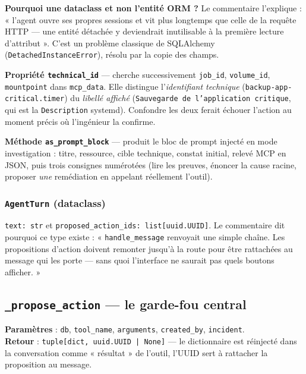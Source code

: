 \documentclass[11pt,a4paper]{report}
\newcommand{\fn}[1]{\texttt{\small\textcolor{oasisviolet}{#1}}}
\newcommand{\cls}[1]{\texttt{\small\textcolor{oasisblue}{#1}}}
\begin{document}
\begin{keybox}
\textbf{Pourquoi une dataclass et non l'entité ORM ?} Le commentaire l'explique :
« l'agent ouvre ses propres sessions et vit plus longtemps que celle de la
requête HTTP --- une entité détachée y deviendrait inutilisable à la première
lecture d'attribut ». C'est un problème classique de SQLAlchemy
(\cls{DetachedInstanceError}), résolu par la copie des champs.
\end{keybox}

\noindent
\textbf{Propriété \fn{technical\_id}} --- cherche successivement
\texttt{job\_id}, \texttt{volume\_id}, \texttt{mountpoint} dans
\texttt{mcp\_data}. Elle distingue l'\emph{identifiant technique}
(\texttt{backup-app-critical.timer}) du \emph{libellé affiché}
(\texttt{Sauvegarde de l'application critique}, qui est la \texttt{Description}
systemd). Confondre les deux ferait échouer l'action au moment précis où
l'ingénieur la confirme.

\noindent
\textbf{Méthode \fn{as\_prompt\_block}} --- produit le bloc de prompt injecté en
mode investigation : titre, ressource, cible technique, constat initial, relevé
MCP en JSON, puis trois consignes numérotées (lire les preuves, énoncer la cause
racine, proposer \emph{une} remédiation en appelant réellement l'outil).

\subsubsection*{\cls{AgentTurn} (dataclass)}
\texttt{text: str} et \texttt{proposed\_action\_ids: list[uuid.UUID]}. Le
commentaire dit pourquoi ce type existe : « \fn{handle\_message} renvoyait une
simple chaîne. Les propositions d'action doivent remonter jusqu'à la route pour
être rattachées au message qui les porte --- sans quoi l'interface ne saurait
pas quels boutons afficher. »

\subsection{\fn{\_propose\_action} --- le garde-fou central}

\textbf{Paramètres} : \texttt{db}, \texttt{tool\_name}, \texttt{arguments},
\texttt{created\_by}, \texttt{incident}.\\
\textbf{Retour} : \texttt{tuple[dict, uuid.UUID | None]} --- le dictionnaire est
réinjecté dans la conversation comme « résultat » de l'outil, l'UUID sert à
rattacher la proposition au message.
\end{document}
